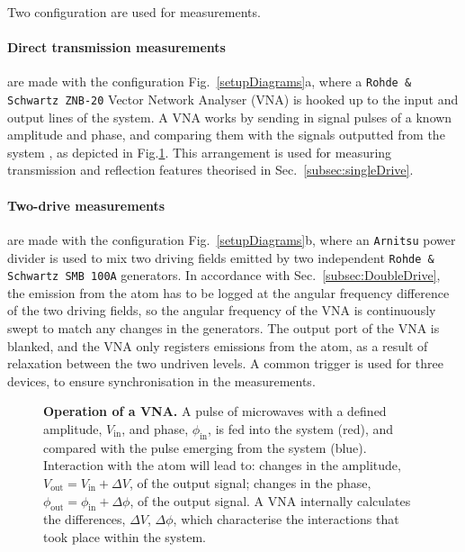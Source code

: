   Two configuration are used for measurements.
  
  \paragraph{Direct transmission measurements} are made with the configuration Fig.~\ref{setupDiagrams}a, where a \texttt{Rohde \& Schwartz ZNB-20} Vector Network Analyser (VNA) is hooked up to the input and output lines of the system. A VNA works by sending in signal pulses of a known amplitude and phase, and comparing them with the signals outputted from the system \cite{vnaAnalyser}, as depicted in Fig.\ref{setupVNA}. This arrangement is used for measuring transmission and reflection features theorised in Sec.~\ref{subsec:singleDrive}.
  
  \paragraph{Two-drive measurements} are made with the configuration Fig.~\ref{setupDiagrams}b, where an \texttt{Arnitsu} power divider is used to mix two driving fields emitted by two independent \texttt{Rohde \& Schwartz SMB 100A} generators. In accordance with Sec.~\ref{subsec:DoubleDrive}, the emission from the atom has to be logged at the angular frequency difference of the two driving fields, so the angular frequency of the VNA is continuously swept to match any changes in the generators. The output port of the VNA is blanked, and the VNA only registers emissions from the atom, as a result of relaxation between the two undriven levels. A common trigger is used for three devices, to ensure synchronisation in the measurements.
  
  \begin{figure}
  	\caption{\small\textbf{Operation of a VNA.} A pulse of microwaves with a defined amplitude, $ V_{\text{in}} $, and phase, $ \phi_{\text{in}} $, is fed into the system (red), and compared with the pulse emerging from the system (blue). Interaction with the atom will lead to: changes in the amplitude, $ V_{\text{out}} = V_{\text{in}} + \Delta V  $, of the output signal; changes in the phase, $ \phi_{\text{out}} = \phi_{\text{in}} + \Delta\phi  $, of the output signal. A VNA internally calculates the differences, $ \Delta V$, $ \Delta\phi $, which characterise the interactions that took place within the system.}
  	\label{setupVNA}
  \end{figure}
    
